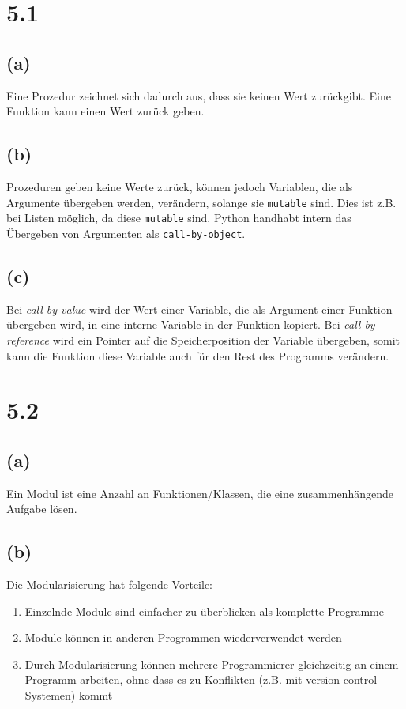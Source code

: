 \section*{5.1}
\subsection*{(a)}
Eine Prozedur zeichnet sich dadurch aus, dass sie keinen Wert zurückgibt. Eine Funktion kann einen Wert zurück geben.

\subsection*{(b)}
Prozeduren geben keine Werte zurück, können jedoch Variablen, die als Argumente übergeben werden, verändern, solange sie \verb+mutable+ sind.
Dies ist z.B. bei Listen möglich, da diese \verb+mutable+ sind. Python handhabt intern das Übergeben von Argumenten als \verb+call-by-object+.

\subsection*{(c)}
Bei \textit{call-by-value} wird der Wert einer Variable, die als Argument einer Funktion übergeben wird, in eine interne Variable in der Funktion kopiert. Bei \textit{call-by-reference} wird ein Pointer auf die Speicherposition der Variable übergeben, somit kann die Funktion diese Variable auch für den Rest des Programms verändern.

\section*{5.2}
\subsection*{(a)}
Ein Modul ist eine Anzahl an Funktionen/Klassen, die eine zusammenhängende Aufgabe lösen.

\subsection*{(b)}
Die Modularisierung hat folgende Vorteile:
\begin{enumerate}
\item Einzelnde Module sind einfacher zu überblicken als komplette Programme
\item Module können in anderen Programmen wiederverwendet werden
\item Durch Modularisierung können mehrere Programmierer gleichzeitig an einem Programm arbeiten, ohne dass es zu Konflikten (z.B. mit version-control-Systemen) kommt
\end{enumerate}

